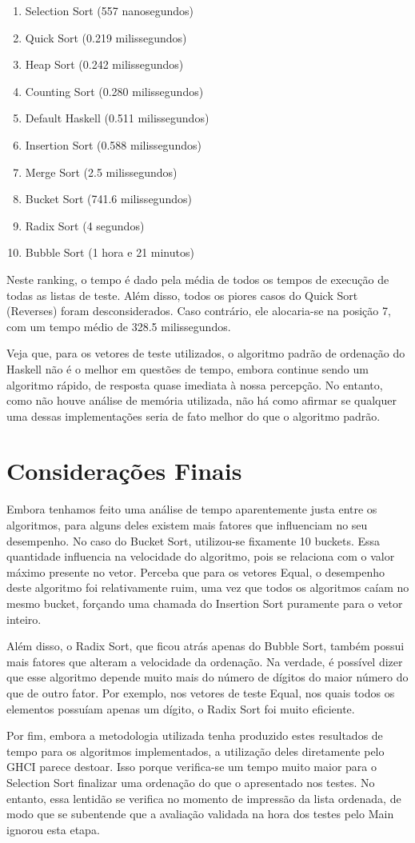 \documentclass[12pt,a4paper]{article}
\begin{document}
\begin{enumerate}
\item Selection Sort (557 nanosegundos)
\item Quick Sort (0.219 milissegundos)
\item Heap Sort (0.242 milissegundos)
\item Counting Sort (0.280 milissegundos)
\item Default Haskell (0.511 milissegundos)
\item Insertion Sort (0.588 milissegundos)
\item Merge Sort (2.5 milissegundos)
\item Bucket Sort (741.6 milissegundos)
\item Radix Sort (4 segundos)
\item Bubble Sort (1 hora e 21 minutos)
\end{enumerate}

Neste ranking, o tempo é dado pela média de todos os tempos de execução de todas as listas de teste. Além disso, todos os piores casos do Quick Sort (Reverses) foram desconsiderados. Caso contrário, ele alocaria-se na posição 7, com um tempo médio de 328.5 milissegundos.

Veja que, para os vetores de teste utilizados, o algoritmo padrão de ordenação do Haskell não é o melhor em questões de tempo, embora continue sendo um algoritmo rápido, de resposta quase imediata à nossa percepção. No entanto, como não houve análise de memória utilizada, não há como afirmar se qualquer uma dessas implementações seria de fato melhor do que o algoritmo padrão.

\section{Considerações Finais}
Embora tenhamos feito uma análise de tempo aparentemente justa entre os algoritmos, para alguns deles existem mais fatores que influenciam no seu desempenho. No caso do Bucket Sort, utilizou-se fixamente 10 buckets. Essa quantidade influencia na velocidade do algoritmo, pois se relaciona com o valor máximo presente no vetor. Perceba que para os vetores Equal, o desempenho deste algoritmo foi relativamente ruim, uma vez que todos os algoritmos caíam no mesmo bucket, forçando uma chamada do Insertion Sort puramente para o vetor inteiro.

Além disso, o Radix Sort, que ficou atrás apenas do Bubble Sort, também possui mais fatores que alteram a velocidade da ordenação. Na verdade, é possível dizer que esse algoritmo depende muito mais do número de dígitos do maior número do que de outro fator. Por exemplo, nos vetores de teste Equal, nos quais todos os elementos possuíam apenas um dígito, o Radix Sort foi muito eficiente.

Por fim, embora a metodologia utilizada tenha produzido estes resultados de tempo para os algoritmos implementados, a utilização deles diretamente pelo GHCI parece destoar. Isso porque verifica-se um tempo muito maior para o Selection Sort finalizar uma ordenação do que o apresentado nos testes. No entanto, essa lentidão se verifica no momento de impressão da lista ordenada, de modo que se subentende que a avaliação validada na hora dos testes pelo Main ignorou esta etapa.
\end{document}
